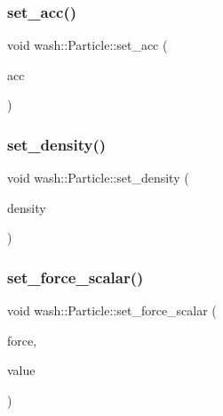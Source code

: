 \mbox{\label{classwash_1_1Particle_a395e095de0b2af7dfc925bedef2090a1}} 
\subsubsection{\texorpdfstring{set\+\_\+acc()}{set\_acc()}}
{\footnotesize\ttfamily void wash\+::\+Particle\+::set\+\_\+acc (\begin{DoxyParamCaption}\item[{const \mbox{\hyperlink{namespacewash_ab2cbbc37941b733095c9225b49b4cad9}{Simulation\+VecT}}}]{acc }\end{DoxyParamCaption})}

\mbox{\label{classwash_1_1Particle_a6416678dd509c16c2933d315b6ae6156}} 
\subsubsection{\texorpdfstring{set\+\_\+density()}{set\_density()}}
{\footnotesize\ttfamily void wash\+::\+Particle\+::set\+\_\+density (\begin{DoxyParamCaption}\item[{const double}]{density }\end{DoxyParamCaption})}

\mbox{\label{classwash_1_1Particle_a2c3038c8eac34e371922bcf1ab79b8ca}} 
\subsubsection{\texorpdfstring{set\+\_\+force\+\_\+scalar()}{set\_force\_scalar()}}
{\footnotesize\ttfamily void wash\+::\+Particle\+::set\+\_\+force\+\_\+scalar (\begin{DoxyParamCaption}\item[{const std\+::string \&}]{force,  }\item[{const double}]{value }\end{DoxyParamCaption})}

